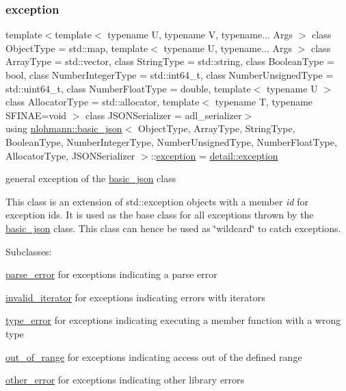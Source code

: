 \subsubsection{\texorpdfstring{exception}{exception}}
{\footnotesize\ttfamily template$<$template$<$ typename U, typename V, typename... Args $>$ class Object\+Type = std\+::map, template$<$ typename U, typename... Args $>$ class Array\+Type = std\+::vector, class String\+Type  = std\+::string, class Boolean\+Type  = bool, class Number\+Integer\+Type  = std\+::int64\+\_\+t, class Number\+Unsigned\+Type  = std\+::uint64\+\_\+t, class Number\+Float\+Type  = double, template$<$ typename U $>$ class Allocator\+Type = std\+::allocator, template$<$ typename T, typename S\+F\+I\+N\+A\+E=void $>$ class J\+S\+O\+N\+Serializer = adl\+\_\+serializer$>$ \\
using \mbox{\hyperlink{classnlohmann_1_1basic__json}{nlohmann\+::basic\+\_\+json}}$<$ Object\+Type, Array\+Type, String\+Type, Boolean\+Type, Number\+Integer\+Type, Number\+Unsigned\+Type, Number\+Float\+Type, Allocator\+Type, J\+S\+O\+N\+Serializer $>$\+::\mbox{\hyperlink{classnlohmann_1_1basic__json_a9a0aced019cb1d65bb49703406c84970}{exception}} =  \mbox{\hyperlink{classnlohmann_1_1detail_1_1exception}{detail\+::exception}}}



general exception of the \mbox{\hyperlink{classnlohmann_1_1basic__json}{basic\+\_\+json}} class 

This class is an extension of {\ttfamily std\+::exception} objects with a member {\itshape id} for exception ids. It is used as the base class for all exceptions thrown by the \mbox{\hyperlink{classnlohmann_1_1basic__json}{basic\+\_\+json}} class. This class can hence be used as \char`\"{}wildcard\char`\"{} to catch exceptions.

Subclasses\+:
\begin{DoxyItemize}
\item \mbox{\hyperlink{classnlohmann_1_1basic__json_af1efc2468e6022be6e35fc2944cabe4d}{parse\+\_\+error}} for exceptions indicating a parse error
\item \mbox{\hyperlink{classnlohmann_1_1basic__json_ac13d32f7cbd02d616e71d8dc30dadcbf}{invalid\+\_\+iterator}} for exceptions indicating errors with iterators
\item \mbox{\hyperlink{classnlohmann_1_1basic__json_a4010e8e268fefd86da773c10318f2902}{type\+\_\+error}} for exceptions indicating executing a member function with a wrong type
\item \mbox{\hyperlink{classnlohmann_1_1basic__json_a28f7c2f087274a0012eb7a2333ee1580}{out\+\_\+of\+\_\+range}} for exceptions indicating access out of the defined range
\item \mbox{\hyperlink{classnlohmann_1_1basic__json_a3333a5a8714912adda33a35b369f7b3d}{other\+\_\+error}} for exceptions indicating other library errors
\end{DoxyItemize}

